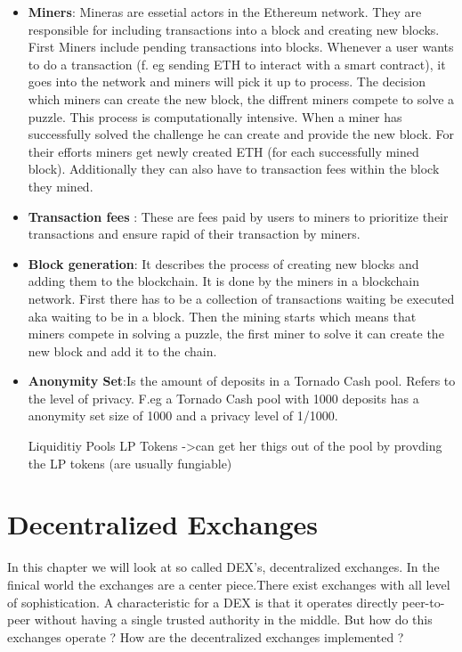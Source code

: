 \documentclass{article}
\begin{document}
\begin{itemize}
\item \textbf{Miners}: Mineras are essetial actors in the Ethereum network. They are responsible for including transactions into a block and creating new blocks. First Miners include pending transactions into blocks. Whenever a user wants to do a transaction (f. eg sending ETH to interact with a smart contract), it goes into the network and  miners will pick it up to process. The decision which miners can create the new block, the diffrent miners compete to solve a puzzle. This process is computationally intensive. When a miner has successfully solved the challenge he can create and provide the new block. For their efforts miners get newly created ETH (for each successfully mined block). Additionally they can also have to transaction fees within the block they mined.
\item \textbf{Transaction fees }:
 These are fees paid by users to miners to prioritize their transactions and ensure rapid of their transaction by miners.
\item \textbf{Block generation}: It describes the process of creating new blocks and adding them to the blockchain. It is done by the miners in a blockchain network. First there has to be a collection of transactions waiting be executed aka waiting to be in a block. Then the mining starts which means that miners compete in solving a puzzle, the first miner to solve it can create the new block and add it to the chain.
\\
\item \textbf{Anonymity Set}:Is the amount of deposits in a Tornado Cash pool. Refers to the level of privacy. F.eg a Tornado Cash pool with 1000 deposits has a anonymity set size of 1000 and a privacy level of 1/1000.


Liquiditiy Pools
LP Tokens ->can get her thigs out of the pool by provding the LP tokens (are usually fungiable)
\end{itemize}

\section{Decentralized Exchanges}
In this chapter we will look at so called DEX's, decentralized exchanges. In the finical world the exchanges are a center piece.There exist exchanges with all level of sophistication. A characteristic for a DEX is that it operates directly peer-to-peer without having a single trusted authority in the middle. But how do this exchanges operate ? How are the decentralized exchanges implemented ?
\end{document}
